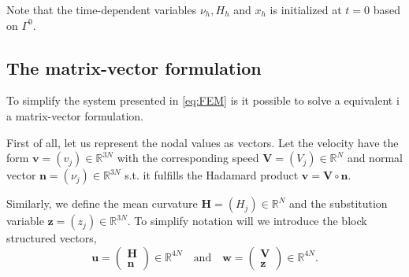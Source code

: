 Note that the time-dependent variables $\nu_{h}, H_{h} $ and $x_{h}$ is initialized at $t=0$  based on $\Gamma ^{0}$.







\subsection{The matrix-vector formulation}%
\label{sub:the_matrix_formulation}

To simplify the system presented in \eqref{eq:FEM} is it possible to solve a equivalent i a matrix-vector formulation.

First of all, let us represent the nodal values as vectors. Let the velocity have the form $\mathbf{v} = \left( v_{j} \right) \in \mathbb{R} ^{3N}$ with the
corresponding speed $\mathbf{V} =
\left( V_{j} \right) \in \mathbb{R} ^{N} $ and normal vector $\mathbf{n} = \left( \nu _{j} \right) \in  \mathbb{R} ^{3N}$ s.t. it fulfills the Hadamard product $\mathbf{v} = \mathbf{V} \circ \mathbf{n}$.

Similarly, we define the mean curvature $\mathbf{H}  = ( H_{j})  \in  \mathbb{R} ^{N}  $ and the substitution variable
$\mathbf{z} = \left( z_{j} \right) \in \mathbb{R} ^{3N}$. To simplify notation will we introduce the block structured vectors,\[
\mathbf{u} = \begin{pmatrix}
\mathbf{H} \\
\mathbf{n}
\end{pmatrix}
\in \mathbb{R} ^{4N}
\quad \text{and} \quad \mathbf{w} = \begin{pmatrix}
\mathbf{V} \\
\mathbf{z}
\end{pmatrix}
\in \mathbb{R} ^{4N}.
\]

